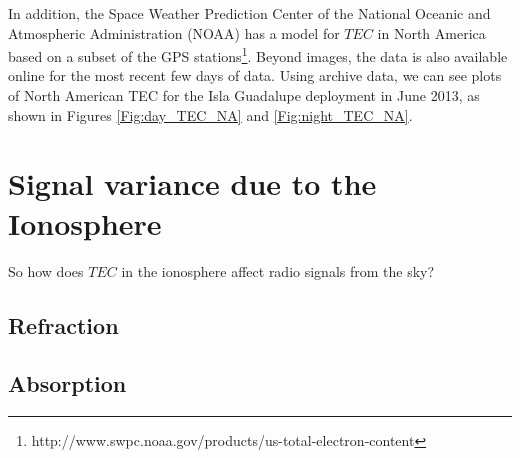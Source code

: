 In addition, the Space Weather Prediction Center of the National Oceanic and Atmospheric Administration (NOAA) has a model for $TEC$ in North America based on a subset of the GPS stations\footnote{http://www.swpc.noaa.gov/products/us-total-electron-content}. Beyond images, the data is also available online for the most recent few days of data. Using archive data, we can see plots of North American TEC for the Isla Guadalupe deployment in June 2013, as shown in Figures \ref{Fig:day_TEC_NA} and \ref{Fig:night_TEC_NA}. 


\section{Signal variance due to the Ionosphere}
So how does $TEC$ in the ionosphere affect radio signals from the sky? 


\subsection{Refraction}

\subsection{Absorption}


